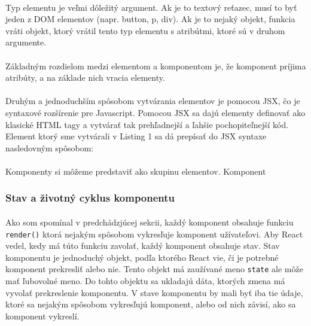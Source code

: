 \paragraph{}
Typ elementu je veľmi dôležitý argument. Ak je to textový reťazec, musí to byť jeden z DOM elementov (napr. button, p, div). Ak je to nejaký objekt, funkcia vráti objekt, ktorý vrátil tento typ elementu s atribútmi, ktoré sú v druhom argumente.

\paragraph{}
Základným rozdielom medzi elementom a komponentom je, že komponent príjima atribúty, a na základe nich vracia elementy.

\paragraph{}
Druhým a jednoduchším spôsobom vytvárania elementov je pomocou JSX, čo je syntaxové rozšírenie pre Javascript. Pomocou JSX sa dajú elementy definovať ako klasické HTML tagy a vytvárať tak prehľadnejší a ľahšie pochopiteľnejší kód. Element ktorý sme vytvárali v Listing 1 sa dá prepísať do JSX syntaxe nasledovným spôsobom:


\paragraph{}
Komponenty si môžeme predstaviť ako skupinu elementov. Komponent 

\subsubsection{Stav a  životný cyklus komponentu}

\paragraph{}
Ako som spomínal v predchádzjúcej sekcii, každý komponent obsahuje funkciu \texttt{render()} ktorá nejakým spôsobom vykresľuje komponent užívateľovi. Aby React vedel, kedy má túto funkciu zavolať, každý komponent obsahuje stav.  Stav komponentu je jednoduchý objekt, podľa ktorého React vie, či je potrebné komponent prekresliť alebo nie. Tento objekt má zaužívané meno \texttt{state} ale môže mať ľubovolné meno. Do tohto objektu sa ukladajú dáta, ktorých zmena má vyvolať prekreslenie komponentu. V stave komponentu by mali byť iba tie údaje, ktoré sa nejakým spôsobom vykresľujú komponent, alebo od nich závisí, ako sa komponent vykreslí. 


